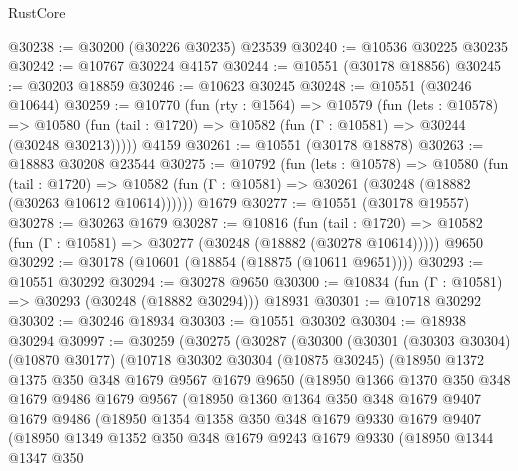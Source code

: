 \begin{lexlean}{RustCore}
\begin{coremodule}
@30238 := @30200 (@30226 @30235) @23539
@30240 := @10536 @30225 @30235
@30242 := @10767 @30224 @4157
@30244 := @10551 (@30178 @18856)
@30245 := @30203 @18859
@30246 := @10623 @30245
@30248 := @10551 (@30246 @10644)
@30259 := @10770
    (fun (rty : @1564) =>
    @10579
      (fun (lets : @10578) =>
      @10580 (fun (tail : @1720) => @10582 (fun (Γ : @10581) => @30244 (@30248 @30213)))))
    @4159
@30261 := @10551 (@30178 @18878)
@30263 := @18883 @30208 @23544
@30275 := @10792
    (fun (lets : @10578) =>
    @10580
      (fun (tail : @1720) =>
      @10582 (fun (Γ : @10581) => @30261 (@30248 (@18882 (@30263 @10612 @10614))))))
    @1679
@30277 := @10551 (@30178 @19557)
@30278 := @30263 @1679
@30287 := @10816
    (fun (tail : @1720) => @10582 (fun (Γ : @10581) => @30277 (@30248 (@18882 (@30278 @10614)))))
    @9650
@30292 := @30178 (@10601 (@18854 (@18875 (@10611 @9651))))
@30293 := @10551 @30292
@30294 := @30278 @9650
@30300 := @10834 (fun (Γ : @10581) => @30293 (@30248 (@18882 @30294))) @18931
@30301 := @10718 @30292
@30302 := @30246 @18934
@30303 := @10551 @30302
@30304 := @18938 @30294
@30997 := @30259
    (@30275
      (@30287
        (@30300
          (@30301
            (@30303 @30304)
            (@10870 @30177)
            (@10718
              @30302
              @30304
              (@10875 @30245)
              (@18950
                @1372
                @1375
                @350
                @348
                @1679
                @9567
                @1679
                @9650
                (@18950
                  @1366
                  @1370
                  @350
                  @348
                  @1679
                  @9486
                  @1679
                  @9567
                  (@18950
                    @1360
                    @1364
                    @350
                    @348
                    @1679
                    @9407
                    @1679
                    @9486
                    (@18950
                      @1354
                      @1358
                      @350
                      @348
                      @1679
                      @9330
                      @1679
                      @9407
                      (@18950
                        @1349
                        @1352
                        @350
                        @348
                        @1679
                        @9243
                        @1679
                        @9330
                        (@18950
                          @1344
                          @1347
                          @350

\end{coremodule}
\end{lexlean}
